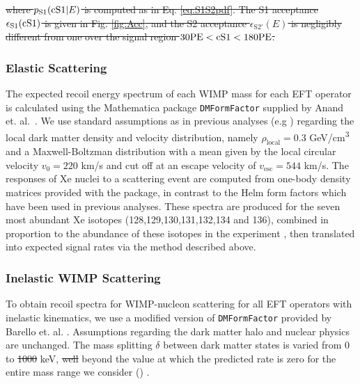 %

\sout{
where $p_\mathrm{S1}(\mathrm{\mathrm{cS1}}|E)$ is computed as in Eq. \ref{eq:S1S2pdf}. The S1 acceptance $\epsilon_\mathrm{S1}(\mathrm{cS1})$ is given in Fig. \ref{fig:Acc}, and the S2 acceptance $\epsilon_\mathrm{S2'}(E)$ is negligibly different from one over the signal region $30 \mathrm{PE} < \mathrm{cS1} < 180 \mathrm{PE}$.
}
\subsubsection{Elastic Scattering}
\label{subsubsec:Elastic}

The expected recoil energy spectrum of each WIMP mass for each EFT operator is calculated using the Mathematica package \texttt{DMFormFactor} supplied by Anand et. al.~\cite{Fitzpatrick:MathTools,Anand:MathTools}. We use standard assumptions as in previous analyses (e.g \cite{xe100_run_combination}) regarding the local dark matter density and velocity distribution, namely $\rho_\mathrm{local} = 0.3$ GeV/cm\textsuperscript{3} and a Maxwell-Boltzman distribution with a mean given by the local circular velocity $v_0 = 220$ km/s and cut off at an escape velocity of $v_\mathrm{esc} = 544$ km/s. The responses of Xe nuclei to a scattering event are computed from one-body density matrices provided with the package, in contrast to the Helm form factors which have been used in previous analyses. These spectra are produced for the seven most abundant Xe isotopes (128,129,130,131,132,134 and 136), combined in proportion to the abundance of these isotopes in the experiment \cite{xe100_run10_sd}, then translated into expected signal rates via the method described above.

\subsubsection{Inelastic WIMP Scattering}
\label{subsubsec:Inelastic}

To obtain recoil spectra for WIMP-nucleon scattering for all EFT operators with inelastic kinematics, we use a modified version of \texttt{DMFormFactor} provided by Barello et. al. \cite{InelasticMath}. Assumptions regarding the dark matter halo and nuclear physics are unchanged. The mass splitting $\delta$ between dark matter states is varied from 0 to \sout{1000}  keV, \sout{well} beyond the value at which the predicted rate is zero for the entire mass range we consider () .
